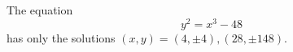 \begin{proposition}\label{eq:077}
    The equation
\[
    y^2=x^3-48
\]
    has only the solutions $(x,y)=(4,\pm4),(28,\pm148)$.
\end{proposition}

